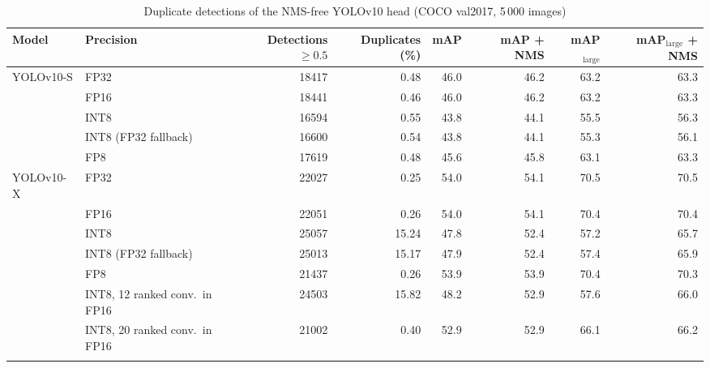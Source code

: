 \begin{table}
\footnotesize\setlength{\tabcolsep}{4pt}
\caption{Duplicate detections of the NMS-free YOLOv10 head (COCO val2017, 5\,000 images)}\label{tab:duplicates}
\begin{tabular}{@{}llrrrrrr@{}}
\toprule
Model & Precision & Detections $\geq0.5$ & Duplicates (\%) & mAP & mAP + NMS & mAP$_\text{large}$ & mAP$_\text{large}$ + NMS \\
\midrule
YOLOv10-S & FP32 & 18417 & 0.48 & 46.0 & 46.2 & 63.2 & 63.3 \\
 & FP16 & 18441 & 0.46 & 46.0 & 46.2 & 63.2 & 63.3 \\
 & INT8 & 16594 & 0.55 & 43.8 & 44.1 & 55.5 & 56.3 \\
 & INT8 (FP32 fallback) & 16600 & 0.54 & 43.8 & 44.1 & 55.3 & 56.1 \\
 & FP8 & 17619 & 0.48 & 45.6 & 45.8 & 63.1 & 63.3 \\
\midrule
YOLOv10-X & FP32 & 22027 & 0.25 & 54.0 & 54.1 & 70.5 & 70.5 \\
 & FP16 & 22051 & 0.26 & 54.0 & 54.1 & 70.4 & 70.4 \\
 & INT8 & 25057 & 15.24 & 47.8 & 52.4 & 57.2 & 65.7 \\
 & INT8 (FP32 fallback) & 25013 & 15.17 & 47.9 & 52.4 & 57.4 & 65.9 \\
 & FP8 & 21437 & 0.26 & 53.9 & 53.9 & 70.4 & 70.3 \\
 & INT8, 12 ranked conv.\ in FP16 & 24503 & 15.82 & 48.2 & 52.9 & 57.6 & 66.0 \\
 & INT8, 20 ranked conv.\ in FP16 & 21002 & 0.40 & 52.9 & 52.9 & 66.1 & 66.2 \\
\botrule
\end{tabular}
\end{table}
